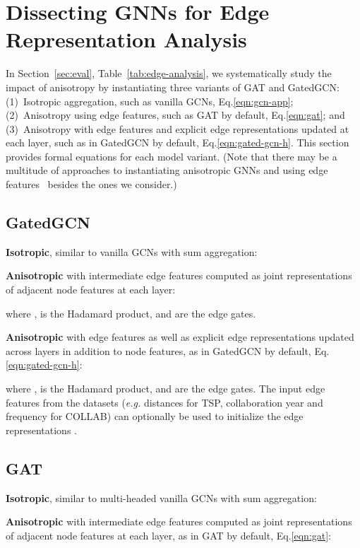 \documentclass{article}
\begin{document}
\section{Dissecting GNNs for Edge Representation Analysis}

In Section~\ref{sec:eval}, Table~\ref{tab:edge-analysis}, we systematically study the impact of anisotropy by instantiating three variants of GAT and GatedGCN:
(1)~Isotropic aggregation, such as
vanilla GCNs, Eq.\eqref{eqn:gcn-app}; 
(2)~Anisotropy using edge features, such as GAT by default, Eq.\eqref{eqn:gat}; and
(3)~Anisotropy with edge features and explicit edge representations updated at each layer, such as in GatedGCN by default, Eq.\eqref{eqn:gated-gcn-h}.
This section provides formal equations for each model variant.
(Note that there may be a multitude of approaches to instantiating anisotropic GNNs and using edge features~\cite{battaglia2016interaction,sanchez2018graph,brockschmidt2019gnn} besides the ones we consider.)


\subsection{GatedGCN}

\textbf{Isotropic}, similar to vanilla GCNs with sum aggregation:


\textbf{Anisotropic} with intermediate edge features computed as joint representations of adjacent node features at each layer:

where ,  is the Hadamard product, and  are the edge gates.
    
\textbf{Anisotropic} with edge features as well as explicit edge representations updated across layers in addition to node features, as in GatedGCN by default, Eq.\eqref{eqn:gated-gcn-h}:

where ,  is the Hadamard product, and  are the edge gates.
The input edge features from the datasets (\textit{e.g.} distances for TSP, collaboration year and frequency for COLLAB) can optionally be used to initialize the edge representations .

\subsection{GAT}

\textbf{Isotropic}, similar to multi-headed vanilla GCNs with sum aggregation:


\textbf{Anisotropic} with intermediate edge features computed as joint representations of adjacent node features at each layer, as in GAT by default, Eq.\eqref{eqn:gat}:
\end{document}
